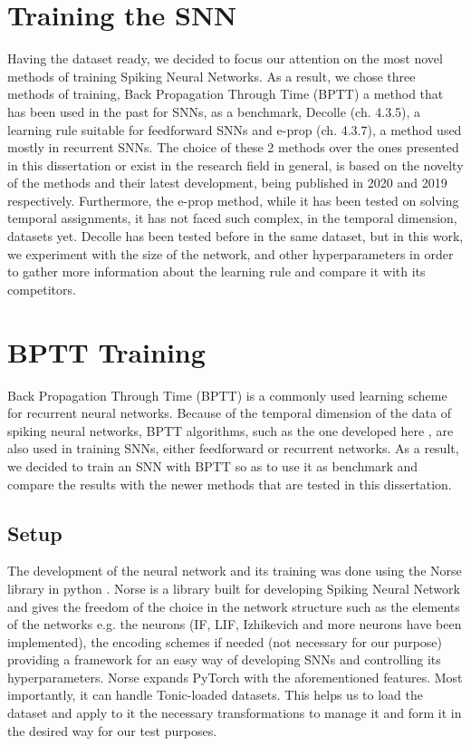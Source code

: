 \documentclass[12pt]{report}
\begin{document}
\section{Training the SNN}

Having the dataset ready, we decided to focus our attention on the most novel methods of training Spiking Neural Networks. As a result, we chose three methods of training, Back Propagation Through Time (BPTT) a method that has been used in the past for SNNs, as a benchmark, Decolle (ch. 4.3.5), a learning rule suitable for feedforward SNNs and e-prop (ch. 4.3.7), a method used mostly in recurrent SNNs. The choice of these 2 methods over the ones presented in this dissertation or exist in the research field in general, is based on the novelty of the methods and their latest development, being published in 2020 and 2019 respectively. Furthermore, the e-prop method, while it has been tested on solving temporal assignments, it has not faced such complex, in the temporal dimension, datasets yet. Decolle has been tested before in the same dataset, but in this work, we experiment with the size of the network, and other hyperparameters in order to gather more information about the learning rule and compare it with its competitors.

\section{BPTT Training}

Back Propagation Through Time (BPTT) is a commonly used learning scheme for recurrent neural networks. Because of the temporal dimension of the data of spiking neural networks, BPTT algorithms, such as the one developed here \cite{Wu2018}, are also used in training SNNs, either feedforward or recurrent networks. As a result, we decided to train an SNN with BPTT so as to use it as benchmark and compare the results with the newer methods that are tested in this dissertation.

\subsection{Setup}

The development of the neural network and its training was done using the Norse library in python \cite{norse2021}. Norse is a library built for developing Spiking Neural Network and gives the freedom of the choice in the network structure such as the elements of the networks e.g. the neurons (IF, LIF, Izhikevich and more neurons have been implemented), the encoding schemes if needed (not necessary for our purpose) providing a framework for an easy way of developing SNNs and controlling its hyperparameters. Norse expands PyTorch with the aforementioned features. Most importantly, it can handle Tonic-loaded datasets. This helps us to load the dataset and apply to it the necessary transformations to manage it and form it in the desired way for our test purposes.
\end{document}
